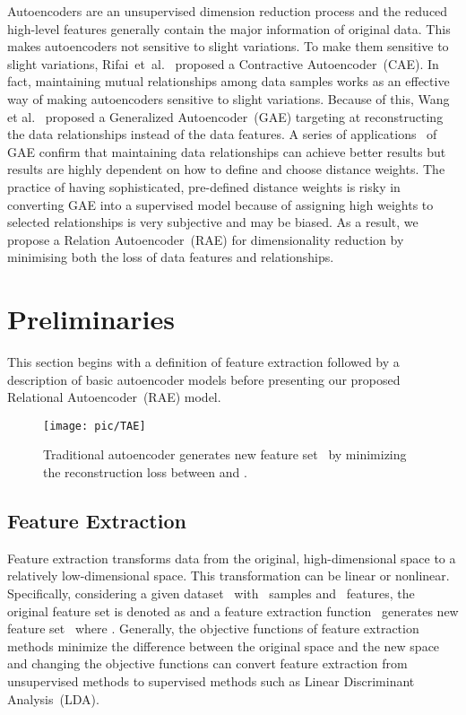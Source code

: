 \documentclass[conference]{IEEEtran}
\begin{document}
	Autoencoders are an unsupervised dimension reduction process and the reduced high-level features generally contain the major information of original data. This makes autoencoders not sensitive to slight variations. To make them sensitive to slight variations, Rifai~et~al.~\cite{rifai2011contractive} proposed a Contractive Autoencoder~(CAE). In fact, maintaining mutual relationships among data samples works as an effective way of making autoencoders sensitive to slight variations. Because of this, Wang et al.~\cite{wang2014generalized} proposed a Generalized Autoencoder~(GAE) targeting at reconstructing the data relationships instead of the data features. A series of applications~\cite{camlica2015autoencoding, stober2015deep, gao2015learning, wang2015dimensionality, meng2016research} of GAE confirm that maintaining data relationships can achieve better results but results are highly dependent on how to define and choose distance weights. The practice of having sophisticated, pre-defined distance weights is risky in converting GAE into a supervised model because of assigning high weights to selected relationships is very subjective and may be biased. As a result, we propose a Relation Autoencoder~(RAE) for dimensionality reduction by minimising both the loss of data features and relationships.
	
	\section{Preliminaries} \label{sec3}
	This section begins with a definition of feature extraction followed by a description of basic autoencoder models before presenting our proposed Relational Autoencoder~(RAE) model.
	\begin{figure}[!t]
		\centering
		\texttt{[image: pic/TAE]}
		\caption{Traditional autoencoder generates new feature set~ by minimizing the reconstruction loss between  and .}
		\label{fig_tae}
	\end{figure}
	
	\subsection{Feature Extraction}
	Feature extraction transforms data from the original, high-dimensional space to a relatively low-dimensional space. This transformation can be linear or nonlinear. Specifically, considering a given dataset~ with ~samples and ~features, the original feature set is denoted as  and a feature extraction function~ generates new feature set~ where . Generally, the objective functions of feature extraction methods minimize the difference between the original space  and the new space  and changing the objective functions can convert feature extraction from unsupervised methods to supervised methods such as Linear Discriminant Analysis~(LDA).
	
\end{document}

